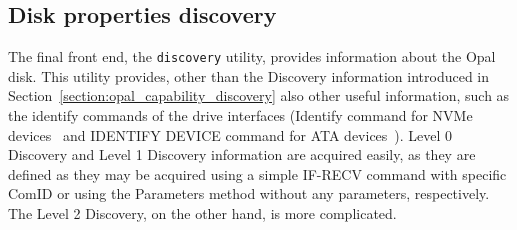 \subsection{Disk properties discovery}
\label{utility_discovery}

The final front end, the \verb|discovery| utility, provides information about the Opal disk.
This utility provides, other than the Discovery information introduced in Section~\ref{section:opal_capability_discovery} also other useful information, such as the identify commands of the drive interfaces (Identify command for NVMe devices~\cite{nvme-express-base-specification} and IDENTIFY DEVICE command for ATA devices~\cite{acs-3}).
Level 0 Discovery and Level 1 Discovery information are acquired easily, as they are defined as they may be acquired using a simple IF-RECV command with specific ComID %
or using the Parameters method without any parameters, respectively.
The Level 2 Discovery, on the other hand, is more complicated.

